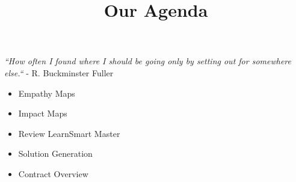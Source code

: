 \documentclass{ximera}
\title{Our Agenda}
\begin{document}
\begin{abstract}

\end{abstract}
\maketitle

\emph{``How often I found where I should be going only by setting out for somewhere else.``} - R. Buckminster Fuller


\begin{itemize}
  \item Empathy Maps
  \item Impact Maps
  \item Review LearnSmart Master
  \item Solution Generation
  \item Contract Overview
\end{itemize}
\end{document}
